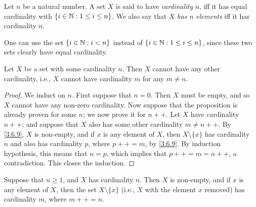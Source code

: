 \begin{defn}\label{3.6.5}
  Let \(n\) be a natural number.
  A set \(X\) is said to have \emph{cardinality} \(n\), iff it has equal cardinality with \(\{i \in \mathbb{N} : 1 \leq i \leq n\}\).
  We also say that \(X\) \emph{has \(n\) elements} iff it has cardinality \(n\).
\end{defn}

\begin{rmk}\label{3.6.6}
  One can use the set \(\{i \in \mathbb{N} : i < n\}\) instead of \(\{i \in \mathbb{N} : 1 \leq i \leq n\}\), since these two sets clearly have equal cardinality.
\end{rmk}

\setcounter{thm}{7}
\begin{prop}\label{3.6.8}
  Let \(X\) be a set with some cardinality \(n\).
  Then \(X\) cannot have any other cardinality, i.e., \(X\) cannot have cardinality \(m\) for any \(m \neq n\).
\end{prop}

\begin{proof}
  We induct on \(n\).
  First suppose that \(n = 0\).
  Then \(X\) must be empty, and so \(X\) cannot have any non-zero cardinality.
  Now suppose that the proposition is already proven for some \(n\);
  we now prove it for \(n++\).
  Let \(X\) have cardinality \(n++\);
  and suppose that \(X\) also has some other cardinality \(m \neq n++\).
  By \cref{3.6.9}, \(X\) is non-empty, and if \(x\) is any element of \(X\), then \(X \setminus \{x\}\) has cardinality \(n\) and also has cardinality \(p\), where \(p++ = m\), by \cref{3.6.9}.
  By induction hypothesis, this means that \(n = p\), which implies that \(p++ = m = n++\), a contradiction.
  This closes the induction.
\end{proof}

\begin{lem}\label{3.6.9}
  Suppose that \(n \geq 1\), and \(X\) has cardinality \(n\).
  Then \(X\) is non-empty, and if \(x\) is any element of \(X\), then the set \(X \setminus \{x\}\) (i.e., \(X\) with the element \(x\) removed) has cardinality \(m\), where \(m++ = n\).
\end{lem}

